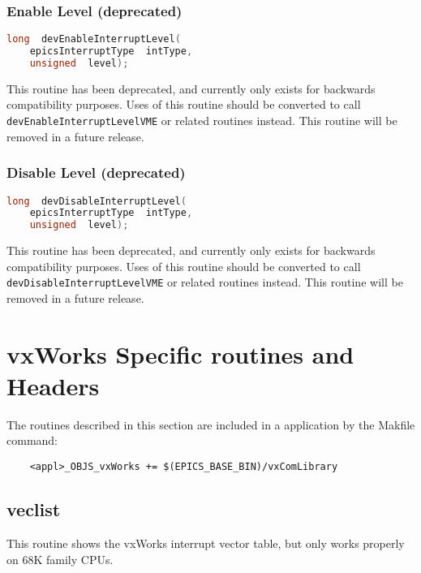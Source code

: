 \subsubsection{Enable Level (deprecated)}

\begin{lstlisting}[language=C]
long  devEnableInterruptLevel(
    epicsInterruptType  intType,
    unsigned  level);
\end{lstlisting}

This routine has been deprecated, and currently only exists for backwards compatibility purposes.
Uses of this routine should be converted to call \verb|devEnableInterruptLevelVME| or related routines instead.
This routine will be removed in a future release.

\subsubsection{Disable Level (deprecated)}

\begin{lstlisting}[language=C]
long  devDisableInterruptLevel(
    epicsInterruptType  intType,
    unsigned  level);
\end{lstlisting}

This routine has been deprecated, and currently only exists for backwards compatibility purposes.
Uses of this routine should be converted to call \verb|devDisableInterruptLevelVME| or related routines instead.
This routine will be removed in a future release.

\section{vxWorks Specific routines and Headers}

The routines described in this section are included in a application by the Makfile command:

\begin{verbatim}
    <appl>_OBJS_vxWorks += $(EPICS_BASE_BIN)/vxComLibrary
\end{verbatim}

\subsection{veclist}

This routine shows the vxWorks interrupt vector table, but only works properly on 68K family CPUs.

